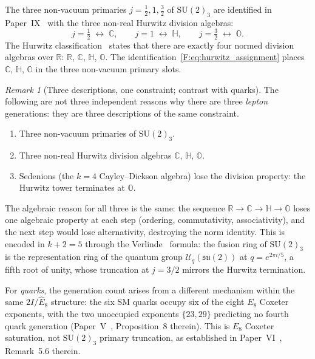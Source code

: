 \documentclass[11pt,a4paper]{article}
\theoremstyle{definition}
\theoremstyle{remark}
\newtheorem{remark}[theorem]{Remark}
\newcommand{\CC}{\mathbb{C}}
\newcommand{\RR}{\mathbb{R}}
\newcommand{\HH}{\mathbb{H}}
\newcommand{\OO}{\mathbb{O}}
\newcommand{\SUtwok}{\mathrm{SU}(2)_3}
\newcommand{\twoI}{2I}
\newcommand{\Ehat}{\hat{E}_8}
\begin{document}
The three non-vacuum primaries $j=\tfrac{1}{2},1,\tfrac{3}{2}$
of $\SUtwok$ are identified in Paper~IX~\cite{Paper9} with the
three non-real Hurwitz division algebras:
\begin{equation}
  j = \tfrac{1}{2} \;\leftrightarrow\; \CC, \qquad
  j = 1           \;\leftrightarrow\; \HH, \qquad
  j = \tfrac{3}{2} \;\leftrightarrow\; \OO.
  \label{F:eq:hurwitz_assignment}
\end{equation}
The Hurwitz classification~\cite{Hurwitz1898} states that there are
exactly four normed division algebras over $\RR$: $\RR$, $\CC$, $\HH$, $\OO$.
The identification~\eqref{F:eq:hurwitz_assignment} places $\CC$, $\HH$, $\OO$
in the three non-vacuum primary slots.

\begin{remark}[Three descriptions, one constraint; contrast with quarks]
\label{F:rem:three_descriptions}
The following are not three independent reasons why there are three
\emph{lepton} generations: they are three descriptions of the same constraint.
\begin{enumerate}[label=(\arabic*)]
  \item Three non-vacuum primaries of $\mathrm{SU}(2)_3$.
  \item Three non-real Hurwitz division algebras $\CC$, $\HH$, $\OO$.
  \item Sedenions (the $k=4$ Cayley--Dickson algebra) lose the
    division property: the Hurwitz tower terminates at $\OO$.
\end{enumerate}
The algebraic reason for all three is the same: the sequence
$\RR\to\CC\to\HH\to\OO$ loses one algebraic property at each step
(ordering, commutativity, associativity), and the next step would lose
alternativity, destroying the norm identity.
This is encoded in $k+2=5$ through the Verlinde~\cite{Verlinde1988} formula:
the fusion ring of $\mathrm{SU}(2)_3$ is the representation ring of
the quantum group $\mathcal{U}_q(\mathfrak{su}(2))$ at $q=e^{2\pi i/5}$,
a fifth root of unity, whose truncation at $j=3/2$ mirrors
the Hurwitz termination.

For \emph{quarks}, the generation count arises from a different mechanism
within the same $\twoI/\Ehat$ structure: the six SM quarks occupy six of the
eight $E_8$ Coxeter exponents, with the two unoccupied exponents $\{23,29\}$
predicting no fourth quark generation (Paper~V~\cite{Paper5},
Proposition~8 therein).
This is $E_8$ Coxeter saturation, not $\mathrm{SU}(2)_3$ primary truncation,
as established in Paper~VI~\cite{Paper6}, Remark~5.6 therein.
\end{remark}
\end{document}
